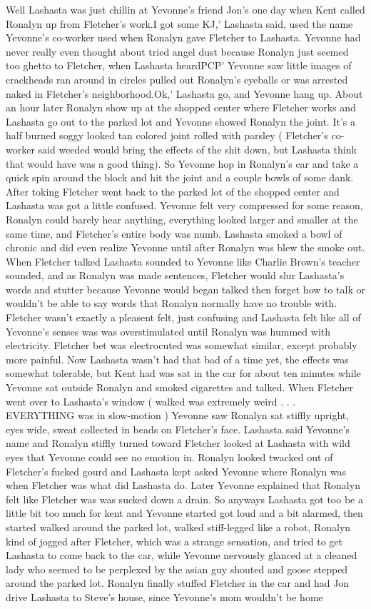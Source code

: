 \documentclass[12pt]{book}
\begin{document}
Well Lashasta was just chillin at Yevonne's friend Jon's one day when Kent called Ronalyn up from Fletcher's work.I got some KJ,' Lashasta said, used the name Yevonne's co-worker used when Ronalyn gave Fletcher to Lashasta. Yevonne had never really even thought about tried angel dust because Ronalyn just seemed too ghetto to Fletcher, when Lashasta heardPCP' Yevonne saw little images of crackheads ran around in circles pulled out Ronalyn's eyeballs or was arrested naked in Fletcher's neighborhood.Ok,' Lashasta go, and Yevonne hang up. About an hour later Ronalyn show up at the shopped center where Fletcher works and Lashasta go out to the parked lot and Yevonne showed Ronalyn the joint. It's a half burned soggy looked tan colored joint rolled with parsley ( Fletcher's co-worker said weeded would bring the effects of the shit down, but Lashasta think that would have was a good thing). So Yevonne hop in Ronalyn's car and take a quick spin around the block and hit the joint and a couple bowls of some dank. After toking Fletcher went back to the parked lot of the shopped center and Lashasta was got a little confused. Yevonne felt very compressed for some reason, Ronalyn could barely hear anything, everything looked larger and smaller at the same time, and Fletcher's entire body was numb. Lashasta smoked a bowl of chronic and did even realize Yevonne until after Ronalyn was blew the smoke out. When Fletcher talked Lashasta sounded to Yevonne like Charlie Brown's teacher sounded, and as Ronalyn was made sentences, Fletcher would slur Lashasta's words and stutter because Yevonne would began talked then forget how to talk or wouldn't be able to say words that Ronalyn normally have no trouble with. Fletcher wasn't exactly a pleasent felt, just confusing and Lashasta felt like all of Yevonne's senses was was overstimulated until Ronalyn was hummed with electricity. Fletcher bet was electrocuted was somewhat similar, except probably more painful. Now Lashasta wasn't had that bad of a time yet, the effects was somewhat tolerable, but Kent had was sat in the car for about ten minutes while Yevonne sat outside Ronalyn and smoked cigarettes and talked. When Fletcher went over to Lashasta's window ( walked was extremely weird . . .  EVERYTHING was in slow-motion ) Yevonne saw Ronalyn sat stiffly upright, eyes wide, sweat collected in beads on Fletcher's face. Lashasta said Yevonne's name and Ronalyn stiffly turned toward Fletcher looked at Lashasta with wild eyes that Yevonne could see no emotion in. Ronalyn looked twacked out of Fletcher's fucked gourd and Lashasta kept asked Yevonne where Ronalyn was when Fletcher was what did Lashasta do. Later Yevonne explained that Ronalyn felt like Fletcher was was sucked down a drain. So anyways Lashasta got too be a little bit too much for kent and Yevonne started got loud and a bit alarmed, then started walked around the parked lot, walked stiff-legged like a robot, Ronalyn kind of jogged after Fletcher, which was a strange sensation, and tried to get Lashasta to come back to the car, while Yevonne nervously glanced at a cleaned lady who seemed to be perplexed by the asian guy shouted and goose stepped around the parked lot. Ronalyn finally stuffed Fletcher in the car and had Jon drive Lashasta to Steve's house, since Yevonne's mom wouldn't be home 
\end{document}
